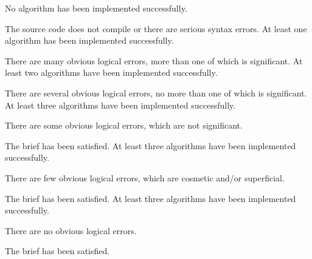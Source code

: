 \documentclass{../../fal_assignment}
\begin{document}
\begin{markingrubric}
%
%
        \grade\fail 	No algorithm has been implemented successfully.
            \par 		The source code does not compile or there are serious syntax errors.
        \grade 		At least one algorithm has been  implemented successfully.
            \par 		There are many obvious logical errors, more than one of which is significant.   
        \grade 		At least two algorithms have been  implemented successfully.
            \par 		There are several obvious logical errors, no more than one of which is significant. 
        \grade 		At least three algorithms have been implemented successfully.
            \par 		There are some obvious logical errors, which are not significant. 
            \par		The brief has been satisfied.
        \grade 		At least three algorithms have been  implemented successfully.
            \par 		There are few obvious logical errors, which are cosmetic and/or superficial.
            \par		The brief has been satisfied.     
        \grade 		At least three algorithms have been  implemented successfully.
            \par		There are no obvious logical errors.
            \par		The brief has been satisfied.

\end{markingrubric}
\end{document}
